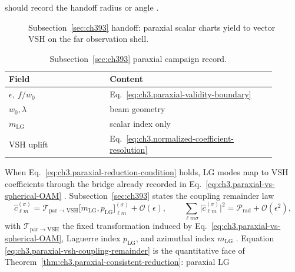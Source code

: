 should record the handoff radius or angle \cite{harrington2001}.
\begin{figure}[t]
\centering
{}
\caption{Subsection~\ref{sec:ch393} handoff: paraxial scalar charts yield to vector VSH on the far observation shell.}
\label{fig:ch3.393-handoff}
\end{figure}
\begin{table}[t]
\centering
\caption{Subsection~\ref{sec:ch393} paraxial campaign record.}
\label{tab:ch3.393-campaign-metadata}
\small
\begin{tabular}{@{}p{0.34\linewidth}p{0.56\linewidth}@{}}
\toprule
Field & Content \\
\midrule
\(\epsilon,\ f/w_{0}\) & Eq.~\eqref{eq:ch3.paraxial-validity-boundary} \\
\(w_{0},\lambda\) & beam geometry \\
\(m_{\mathrm{LG}}\) & scalar index only \\
VSH uplift & Eq.~\eqref{eq:ch3.normalized-coefficient-resolution} \\
\bottomrule
\end{tabular}
\end{table}
When Eq.~\eqref{eq:ch3.paraxial-reduction-condition} holds, LG modes map to VSH coefficients through the bridge already recorded in
Eq.~\eqref{eq:ch3.paraxial-vs-spherical-OAM} \cite{allen1992}. Subsection~\ref{sec:ch393} states the coupling remainder law
\begin{equation}
\label{eq:ch3.paraxial-vsh-coupling-remainder}
\widehat{c}_{\ell m}^{(\sigma)}
=
\mathcal{T}_{\mathrm{par}\to\mathrm{VSH}}\bigl[m_{\mathrm{LG}},p_{\mathrm{LG}}\bigr]_{\ell m}^{(\sigma)}
+
\mathcal{O}(\epsilon),
\qquad
\sum_{\ell m\sigma}\bigl|\widehat{c}_{\ell m}^{(\sigma)}\bigr|^{2}
=
\mathcal{P}_{\mathrm{rad}}+\mathcal{O}(\epsilon^{2}),
\end{equation}
with \(\mathcal{T}_{\mathrm{par}\to\mathrm{VSH}}\) the fixed transformation induced by Eq.~\eqref{eq:ch3.paraxial-vs-spherical-OAM},
Laguerre index \(p_{\mathrm{LG}}\), and azimuthal index \(m_{\mathrm{LG}}\) \cite{allen1992}. Equation
\eqref{eq:ch3.paraxial-vsh-coupling-remainder} is the quantitative face of Theorem~\ref{thm:ch3.paraxial-consistent-reduction}: paraxial LG
